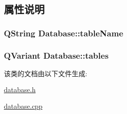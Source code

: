 \subsection{属性说明}
\subsubsection[{\texorpdfstring{table\+Name}{tableName}}]{\setlength{\rightskip}{0pt plus 5cm}Q\+String Database\+::table\+Name\hspace{0.3cm}{\ttfamily [read]}}\hypertarget{class_database_a9f617c90d57d4c5b14e96e51c1aea92b}{}\label{class_database_a9f617c90d57d4c5b14e96e51c1aea92b}
\subsubsection[{\texorpdfstring{tables}{tables}}]{\setlength{\rightskip}{0pt plus 5cm}Q\+Variant Database\+::tables\hspace{0.3cm}{\ttfamily [read]}}\hypertarget{class_database_ad44cff8b67b203182ef6d2b8f01126cf}{}\label{class_database_ad44cff8b67b203182ef6d2b8f01126cf}


该类的文档由以下文件生成\+:\begin{DoxyCompactItemize}
\item 
\hyperlink{database_8h}{database.\+h}\item 
\hyperlink{database_8cpp}{database.\+cpp}\end{DoxyCompactItemize}
